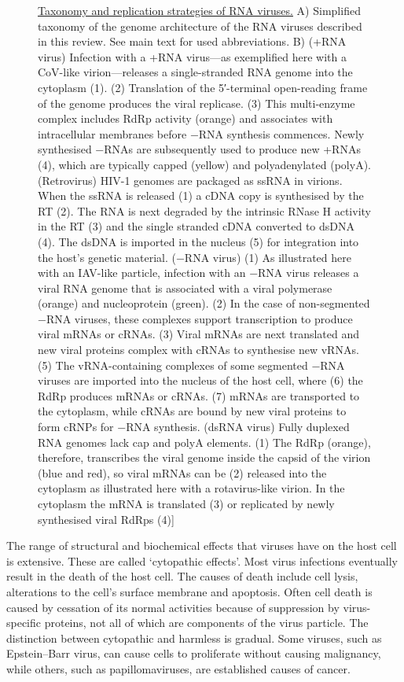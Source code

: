 \begin{figure}
\caption{\href{https://commons.wikimedia.org/wiki/File:18_2014_1695_Fig1_HTML.webp}{Taxonomy and replication strategies of RNA viruses.} A) Simplified taxonomy of the genome architecture of the RNA viruses described in this review. See main text for used abbreviations. B) (+RNA virus) Infection with a +RNA virus---as exemplified here with a CoV-like virion---releases a single-stranded RNA genome into the cytoplasm (1). (2) Translation of the 5′-terminal open-reading frame of the genome produces the viral replicase. (3) This multi-enzyme complex includes RdRp activity (orange) and associates with intracellular membranes before −RNA synthesis commences. Newly synthesised −RNAs are subsequently used to produce new +RNAs (4), which are typically capped (yellow) and polyadenylated (polyA). (Retrovirus) HIV-1 genomes are packaged as ssRNA in virions. When the ssRNA is released (1) a cDNA copy is synthesised by the RT (2). The RNA is next degraded by the intrinsic RNase H activity in the RT (3) and the single stranded cDNA converted to dsDNA (4). The dsDNA is imported in the nucleus (5) for integration into the host's genetic material. (−RNA virus) (1) As illustrated here with an IAV-like particle, infection with an −RNA virus releases a viral RNA genome that is associated with a viral polymerase (orange) and nucleoprotein (green). (2) In the case of non-segmented −RNA viruses, these complexes support transcription to produce viral mRNAs or cRNAs. (3) Viral mRNAs are next translated and new viral proteins complex with cRNAs to synthesise new vRNAs. (5) The vRNA-containing complexes of some segmented −RNA viruses are imported into the nucleus of the host cell, where (6) the RdRp produces mRNAs or cRNAs. (7) mRNAs are transported to the cytoplasm, while cRNAs are bound by new viral proteins to form cRNPs for −RNA synthesis. (dsRNA virus) Fully duplexed RNA genomes lack cap and polyA elements. (1) The RdRp (orange), therefore, transcribes the viral genome inside the capsid of the virion (blue and red), so viral mRNAs can be (2) released into the cytoplasm as illustrated here with a rotavirus-like virion. In the cytoplasm the mRNA is translated (3) or replicated by newly synthesised viral RdRps (4){]}}\label{fig:rnavirus}
\end{figure}

The range of structural and biochemical effects that viruses have on the host cell is extensive. These are called `cytopathic effects'. Most virus infections eventually result in the death of the host cell. The causes of death include cell lysis, alterations to the cell's surface membrane and apoptosis. Often cell death is caused by cessation of its normal activities because of suppression by virus-specific proteins, not all of which are components of the virus particle. The distinction between cytopathic and harmless is gradual. Some viruses, such as Epstein--Barr virus, can cause cells to proliferate without causing malignancy, while others, such as papillomaviruses, are established causes of cancer.

